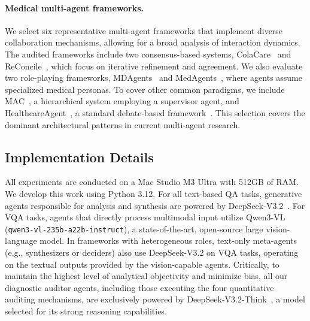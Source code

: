 \paragraph{Medical multi-agent frameworks.}
We select six representative multi-agent frameworks that implement diverse collaboration mechanisms, allowing for a broad analysis of interaction dynamics. The audited frameworks include two consensus-based systems, ColaCare~\cite{wang2025colacare} and ReConcile~\cite{chen2024reconcile}, which focus on iterative refinement and agreement. We also evaluate two role-playing frameworks, MDAgents~\cite{kim2024mdagents} and MedAgents~\cite{tang2024medagents}, where agents assume specialized medical personas. To cover other common paradigms, we include MAC~\cite{chen2025enhancing}, a hierarchical system employing a supervisor agent, and HealthcareAgent~\cite{ren2025healthcare}, a standard debate-based framework~\cite{du2023improving}. This selection covers the dominant architectural patterns in current multi-agent research.

\subsection{Implementation Details}

All experiments are conducted on a Mac Studio M3 Ultra with 512GB of RAM. We develop this work using Python 3.12. For all text-based QA tasks, generative agents responsible for analysis and synthesis are powered by DeepSeek-V3.2~\cite{liu2024deepseekv3,deepseek_v32}. For VQA tasks, agents that directly process multimodal input utilize Qwen3-VL~\cite{Qwen25VL,Qwen3VL} (\texttt{qwen3-vl-235b-a22b-instruct}), a state-of-the-art, open-source large vision-language model. In frameworks with heterogeneous roles, text-only meta-agents (e.g., synthesizers or deciders) also use DeepSeek-V3.2 on VQA tasks, operating on the textual outputs provided by the vision-capable agents. Critically, to maintain the highest level of analytical objectivity and minimize bias, all our diagnostic auditor agents, including those executing the four quantitative auditing mechanisms, are exclusively powered by DeepSeek-V3.2-Think~\cite{liu2024deepseekv3,guo2025deepseekr1}, a model selected for its strong reasoning capabilities.

